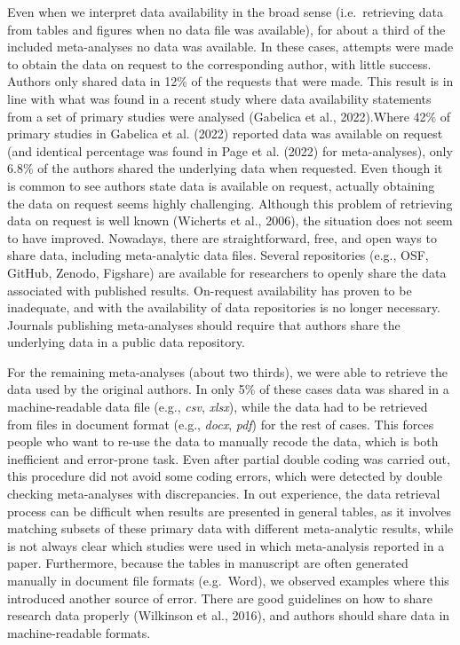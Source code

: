 \documentclass[
  ,apa7,floatsintext]{apa6}
\begin{document}
Even when we interpret data availability in the broad sense (i.e.~retrieving data from tables and figures when no data file was available), for about a third of the included meta-analyses no data was available. In these cases, attempts were made to obtain the data on request to the corresponding author, with little success. Authors only shared data in 12\% of the requests that were made. This result is in line with what was found in a recent study where data availability statements from a set of primary studies were analysed (Gabelica et al., 2022).Where 42\% of primary studies in Gabelica et al. (2022) reported data was available on request (and identical percentage was found in Page et al. (2022) for meta-analyses), only 6.8\% of the authors shared the underlying data when requested. Even though it is common to see authors state data is available on request, actually obtaining the data on request seems highly challenging. Although this problem of retrieving data on request is well known (Wicherts et al., 2006), the situation does not seem to have improved. Nowadays, there are straightforward, free, and open ways to share data, including meta-analytic data files. Several repositories (e.g., OSF, GitHub, Zenodo, Figshare) are available for researchers to openly share the data associated with published results. On-request availability has proven to be inadequate, and with the availability of data repositories is no longer necessary. Journals publishing meta-analyses should require that authors share the underlying data in a public data repository.

For the remaining meta-analyses (about two thirds), we were able to retrieve the data used by the original authors. In only 5\% of these cases data was shared in a machine-readable data file (e.g., \emph{csv}, \emph{xlsx}), while the data had to be retrieved from files in document format (e.g., \emph{docx}, \emph{pdf}) for the rest of cases. This forces people who want to re-use the data to manually recode the data, which is both inefficient and error-prone task. Even after partial double coding was carried out, this procedure did not avoid some coding errors, which were detected by double checking meta-analyses with discrepancies. In out experience, the data retrieval process can be difficult when results are presented in general tables, as it involves matching subsets of these primary data with different meta-analytic results, while is not always clear which studies were used in which meta-analysis reported in a paper. Furthermore, because the tables in manuscript are often generated manually in document file formats (e.g.~Word), we observed examples where this introduced another source of error. There are good guidelines on how to share research data properly (Wilkinson et al., 2016), and authors should share data in machine-readable formats.
\end{document}
